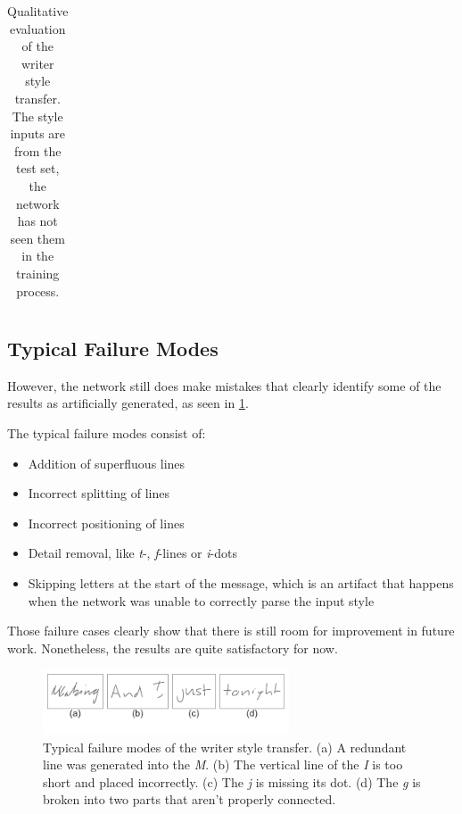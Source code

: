 \begin{table}
\begin{tabular}{ll}
  \bottomrule
  \end{tabular}
  \caption[Qualitative evaluation of the writer style transfer]{Qualitative evaluation of the writer style transfer. The style inputs are from the test set, the network has not seen them in the training process.}
  \label{table:writerStyleTransferEvaluation}
\end{table}

\subsection{Typical Failure Modes}

However, the network still does make mistakes that clearly identify some of the results as artificially generated, as seen in \cref{fig:writerStyleTransferFailures}. 

The typical failure modes consist of:
\begin{itemize}[topsep=0pt,itemsep=-1ex,partopsep=1ex,parsep=1ex]
\item Addition of superfluous lines
\item Incorrect splitting of lines
\item Incorrect positioning of lines
\item Detail removal, like \emph{t}-, \emph{f}-lines or \emph{i}-dots 
\item Skipping letters at the start of the message, which is an artifact that happens when the network was unable to correctly parse the input style
\end{itemize}

Those failure cases clearly show that there is still room for improvement in future work. Nonetheless, the results are quite satisfactory for now.

\begin{figure}[H]
  \centering
  \vspace{0.05\textwidth}
  \includegraphics[width=0.65\textwidth]{../assets/style_transfer/failures.pdf}
  \caption[Typical failure modes of the writer style transfer]{Typical failure modes of the writer style transfer. (a) A redundant line was generated into the \emph{M}. (b) The vertical line of the \emph{I} is too short and placed incorrectly. (c) The \emph{j} is missing its dot. (d) The \emph{g} is broken into two parts that aren't properly connected.}
  \label{fig:writerStyleTransferFailures}
\end{figure}

